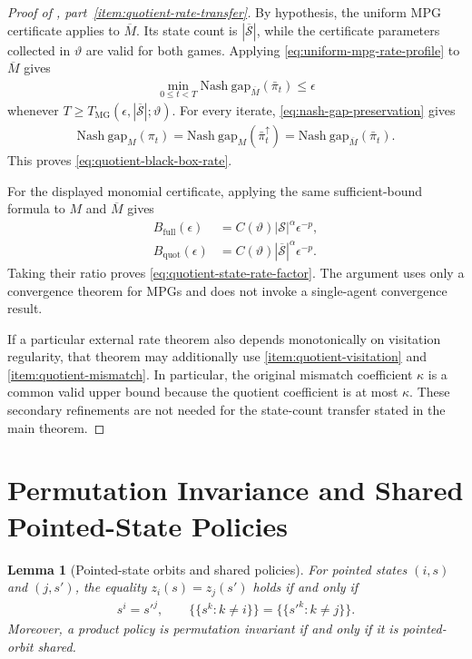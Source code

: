 \documentclass{article}
\theoremstyle{plain}
\newtheorem{lemma}[theorem]{Lemma}
\theoremstyle{definition}
\theoremstyle{remark}
\newcommand{\Nash}{\mathrm{Nash\ gap}}
\newcommand{\St}{\mathcal{S}}
\newcommand{\abs}[1]{\left\lvert#1\right\rvert}
\newcommand{\quotient}[1]{\overline{#1}}
\begin{document}
\begin{proof}[Proof of ,
part~\ref{item:quotient-rate-transfer}]
By hypothesis, the uniform MPG certificate applies to
$\quotient M$. Its state count is $\abs{\quotient\St}$, while the certificate
parameters collected in $\vartheta$ are valid for both games. Applying
\eqref{eq:uniform-mpg-rate-profile} to $\quotient M$ gives
\begin{align*}
  \min_{0\le t<T}\Nash_{\quotient M}(\bar\pi_t)
  \le\epsilon
\end{align*}
whenever
$T\ge
T_{\mathrm{MG}}
(\epsilon,\abs{\quotient\St};\vartheta)$.
For every iterate, \eqref{eq:nash-gap-preservation} gives
\begin{align*}
  \Nash_M(\pi_t)
  =
  \Nash_M(\bar\pi_t^\uparrow)
  =
  \Nash_{\quotient M}(\bar\pi_t).
\end{align*}
This proves \eqref{eq:quotient-black-box-rate}.

For the displayed monomial certificate, applying the same sufficient-bound formula
to $M$ and $\quotient M$ gives
\begin{align*}
  B_{\mathrm{full}}(\epsilon)
  &=
  C(\vartheta)\abs\St^\alpha\epsilon^{-p},\\
  B_{\mathrm{quot}}(\epsilon)
  &=
  C(\vartheta)\abs{\quotient\St}^\alpha\epsilon^{-p}.
\end{align*}
Taking their ratio proves \eqref{eq:quotient-state-rate-factor}. The argument
uses only a convergence theorem for MPGs and does not invoke a single-agent
convergence result.

If a particular external rate theorem also depends monotonically on visitation
regularity, that theorem may additionally use
\ref{item:quotient-visitation} and
\ref{item:quotient-mismatch}.
In particular, the original mismatch coefficient $\kappa$ is a common valid upper
bound because the quotient coefficient is at most $\kappa$. These secondary
refinements are not needed for the state-count transfer stated in the main
theorem.
\end{proof}

\section{Permutation Invariance and Shared Pointed-State Policies}
\label{app:proof-perm-sharing}

\begin{lemma}[Pointed-state orbits and shared policies]
\label{lemma:perm-sharing}
For pointed states $(i,s)$ and $(j,s')$, the equality $z_i(s)=z_j(s')$ holds
if and only if
\begin{align*}
  s^i=s'^j,
  \qquad
  \{\!\{s^k:k\ne i\}\!\}
  =
  \{\!\{s'^k:k\ne j\}\!\}.
\end{align*}
Moreover, a product policy is permutation invariant if and only if it is
pointed-orbit shared.
\end{lemma}
\end{document}
